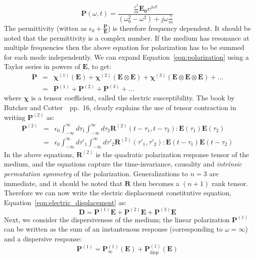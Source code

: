 \documentclass{article}[12pt]
\theoremstyle{plain}
\begin{document}
\begin{equation}
\mathbf{P}(\omega,t) = \frac{ \frac{e^2}{m} \mathbf{E_0}e^{j\omega t}}{(\omega_0^2-\omega^2)+j\omega\frac{\gamma}{m}}
\label{eqn:polarization}
\end{equation}
The permittivity (witten as $\epsilon_0+\frac{\mathbf{P}}{\mathbf{E}}$) is therefore frequency dependent.
It should be noted that the permittivity is a complex number. If the medium has resonance at multiple frequencies
then the above equation for polarization has to be summed for each mode independently. We can expand
Equation~\ref{eqn:polarization} using a Taylor series in powers of $\mathbf{E}$, to get:
\begin{eqnarray}
\mathbf{P} & = & \mathbf{\chi}^{(1)}(\mathbf{E}) + \mathbf{\chi}^{(2)}(\mathbf{E}\otimes\mathbf{E}) + \mathbf{\chi}^{(3)}(\mathbf{E}\otimes\mathbf{E}\otimes\mathbf{E}) + \ldots \nonumber \\
           & = & \mathbf{P}^{(1)} + \mathbf{P}^{(2)} + \mathbf{P}^{(3)} + \ldots \label{eqn:nonlinear-polarization}
\end{eqnarray}
where $\mathbf{\chi}$ is a tensor coefficient, called the electric susceptibility. 
The book by Butcher and Cotter~\cite{butcher1991elements}~pp.~16, clearly
explains the use of tensor contraction in writing $\mathbf{P}^{(2)}$ as:
\begin{eqnarray}
\mathbf{P}^{(2)} & = & \epsilon_0 \int_{-\infty}^\infty d\tau_1 \int_{-\infty}^\infty d\tau_2 \mathbf{R}^{(2)} (t-\tau_1, t-\tau_2): \mathbf{E}(\tau_1) \mathbf{E}(\tau_2) \\
& = & \epsilon_0 \int_{-\infty}^\infty d\tau'_1 \int_{-\infty}^\infty d\tau'_2 \mathbf{R}^{(2)} (\tau'_1, \tau'_2): \mathbf{E}(t-\tau_1) \mathbf{E}(t-\tau_2) 
\end{eqnarray}
In the above equations, $\mathbf{R}^{(2)}$ is the quadratic polarization
response tensor of the medium, and the equations capture the time-invariance,
causality and \emph{intrinsic permutation symmetry} of the
polarization. Generalizations to $n=3$ are immediate, and it should be
noted that $\mathbf{R}$ then becomes a $(n+1)$ rank tensor.
Therefore we can now
write the electric displacement constitutive equation, Equation~\ref{eqn:electric_displacement} as:
\begin{equation}
\mathbf{D} = \mathbf{P}^{(1)}\mathbf{E} + \mathbf{P}^{(2)}\mathbf{E} + \mathbf{P}^{(3)}\mathbf{E} 
\label{eqn:electric_displacement_2}
\end{equation}
Next, we consider the dispersiveness of the medium; the linear polarization $\mathbf{P}^{(1)}$ can
be written as the sum of an instantenous response (corresponding to $\omega=\infty$) and a
dispersive response:
\begin{equation}
\mathbf{P}^{(1)} = \mathbf{P}^{(1)}_{\infty}(\mathbf{E}) + \mathbf{P}^{(1)}_{\mathrm{disp}}(\mathbf{E}) \label{eqn:electric_displacement_3}
\end{equation}
\end{document}
